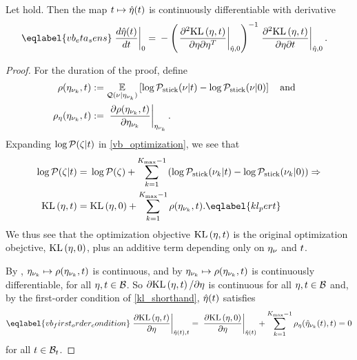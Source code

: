 \begin{thm}
%
Let  hold.  Then the map $t \mapsto
\hat\eta(t)$ is continuously differentiable with derivative
%
\begin{align}\eqlabel{vb_eta_sens}
%
\fracat{d \etaopt(\t)}{d \t}{0} ={}&
    - \left( \fracat{\partial^2 \KL{\eta, \t}}
                    {\partial \eta \partial \eta^T}
                    {\etaopt, 0} \right)^{-1}
    \fracat{\partial^2 \KL{\eta, \t}}
           {\partial \eta \partial \t}
           {\etaopt, 0}.
%
\end{align}
%
%
\begin{proof}
%
For the duration of the proof, define
%
\begin{align*}
%
\rho(\etanuk, \t) :={}&
    \expect{\q(\nu \vert \etanuk)}
           {\log \pstick(\nu \vert \t) - \log \pstick(\nu \vert 0)}
\mathand\\
\rho_\eta(\etanuk, \t) :={}&
\fracat{\partial \rho(\etanuk, \t)}
       {\partial \etanuk}{\etanuk}.
%
\end{align*}
%
Expanding $\log \mathcal{P}(\zeta \vert t)$ in \eqref{vb_optimization}, we see that
%
\begin{align}
%
\logp(\zeta \vert \t) ={}& \logp(\zeta) +
    \sumkm \left( \log \pstick(\nuk\vert\t) -
                  \log \pstick(\nuk \vert 0) \right) \Rightarrow \nonumber\\
\KL{\eta, \t} ={}&
    \KL{\eta, 0} + \sumkm \rho(\etanuk, \t). \eqlabel{kl_pert}
%
\end{align}
%
We thus see that the optimization objective $\mathrm{KL}\left(\eta, t\right)$ is the original
optimization obejctive, $\mathrm{KL}\left(\eta, 0\right)$, plus an additive term depending only on
$\eta_{\nu}$ and $t$.

By , $\eta_{\nu_{k}} \mapsto \rho(\eta_{\nu_{k}}, t)$ is continuous, and
by  $\eta_{\nu_{k}} \mapsto \rho(\eta_{\nu_{k}}, t)$ is continuously
differentiable, for all $\eta, t \in \mathcal{B}$.  So $\partial \mathrm{KL}\left(\eta, t\right)  /
\partial \eta$ is continuous for all $\eta, t \in \mathcal{B}$ and, by the
first-order condition of \eqref{kl_shorthand}, $\hat\eta(t)$ satisfies
%
\begin{align}\eqlabel{vb_first_order_condition}
%
\fracat{\partial \KL{\eta, \t}}{ \partial \eta}{\etaopt(\t), \t} ={}
\fracat{\partial \KL{\eta, 0}}{ \partial \eta}{\etaopt(\t)}
+  \sumkm \rho_\eta(\etaoptnuk(\t), \t) ={} 0
%
\end{align}
%
for all $t \in \mathcal{B}_t$.


\end{proof}
\end{thm}
